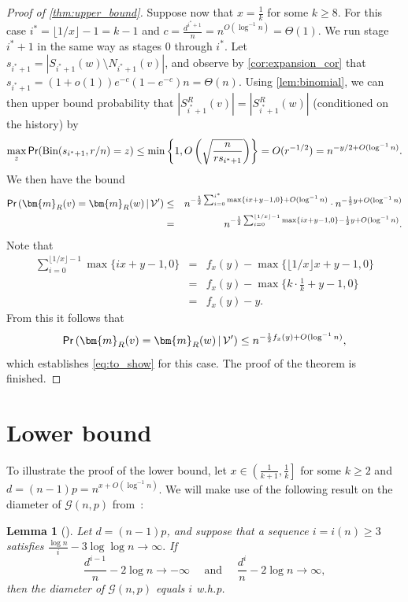 \documentclass[12pt]{article}
\newtheorem{lemma}[theorem]{Lemma}
\theoremstyle{definition}
\theoremstyle{remark}
\theoremstyle{remark}
\numberwithin{theorem}{section}
\newcommand{\prob}{\textsf{\upshape Pr}}
\newcommand{\Gnp}{\mathcal{G}(n,p)}
\begin{document}
\begin{proof}[Proof of \cref{thm:upper_bound}]
Suppose now that $x = \frac{1}{k}$ for some $k \ge 8$. For this case $i^{*} = \lfloor 1/x \rfloor -1 = k-1$ and $c = \frac{d^{i^{*}+1}}{n} = n^{O(\log^{-1}n)}= \Theta(1)$. We run stage $i^{*}+1$ in the same way as stages $0$ through $i^{*}$. Let $s_{i^{*}+1} = |S_{i^{*}+1}(w) \setminus N_{i^{*}+1}(v)|$, and observe by \cref{cor:expansion_cor} that $s_{i^{*}+1} = (1+o(1))e^{-c}(1-e^{-c})n = \Theta(n)$. Using \cref{lem:binomial}, we can then upper bound probability that $|S_{i^{*}+1}^{R}(v)| = |S_{i^{*}+1}^{R}(w)|$ (conditioned on the history) by
$$
	\max_{z}\prob(\text{Bin}(s_{i^{*}+1}, r/n) = z) \leq \min\left\{1, O\left(\sqrt{\frac{n}{rs_{i^{*}+1}}}\right) \right\} = O(r^{-1/2}) = n^{-y/2 + O(\log^{-1}n)}.
$$
We then have the bound
\begin{eqnarray*}
	\prob\left(\bm{m}_{R}(v) = \bm{m}_{R}(w)\,|\,\mathcal{V}' \right) &\leq& n^{-\frac{1}{2}\sum_{i=0}^{i^{*}}\max\{ix + y - 1,0\} + O(\log^{-1}n)} \cdot n^{-\frac{1}{2}y + O(\log^{-1}n)}\\
	&=&n^{-\frac{1}{2}\sum_{i=0}^{\lfloor 1/x \rfloor -1}\max\{ix + y - 1,0\} - \frac{1}{2}y + O(\log^{-1}n)}.
\end{eqnarray*}
Note that
\begin{eqnarray*}
	\sum_{i=0}^{\lfloor1/x\rfloor - 1}\max\{ix+y-1,0\} &=& f_{x}(y) - \max\{\lfloor1/x\rfloor x + y-1,0\}\\
	&=& f_{x}(y) - \max\{k \cdot \frac{1}{k} + y - 1,0\}\\
	&=&f_{x}(y) - y.
\end{eqnarray*}
From this it follows that
$$
	\prob\left(\bm{m}_{R}(v) = \bm{m}_{R}(w)\,|\,\mathcal{V}' \right) \leq n^{-\frac{1}{2}f_{x}(y) + O(\log^{-1}n)},
$$
which establishes \eqref{eq:to_show} for this case. The proof of the theorem is finished.
\end{proof}

\section{Lower bound}\label{sec:lower_bound}

To illustrate the proof of the lower bound, let $x \in \left(\frac{1}{k+1}, \frac{1}{k}\right]$ for some $k \geq 2$ and $d = (n-1)p = n^{x + O(\log^{-1}n)}$. We will make use of the following result on the diameter of $\Gnp$ from~\cite{bollobas1998random}:

\begin{lemma}[]\label{lem:diameter}
	Let $d = (n-1)p$, and suppose that a sequence $i = i(n) \geq 3$ satisfies $\frac{\log n}{i} - 3\log\log n \to \infty.$ If 
	$$
		\frac{d^{i-1}}{n} - 2\log n \to -\infty \quad\text{ and }\quad \frac{d^{i}}{n} - 2\log n \to \infty,
	$$
	then the diameter of $\Gnp$ equals $i$ w.h.p.
\end{lemma}
\end{document}

